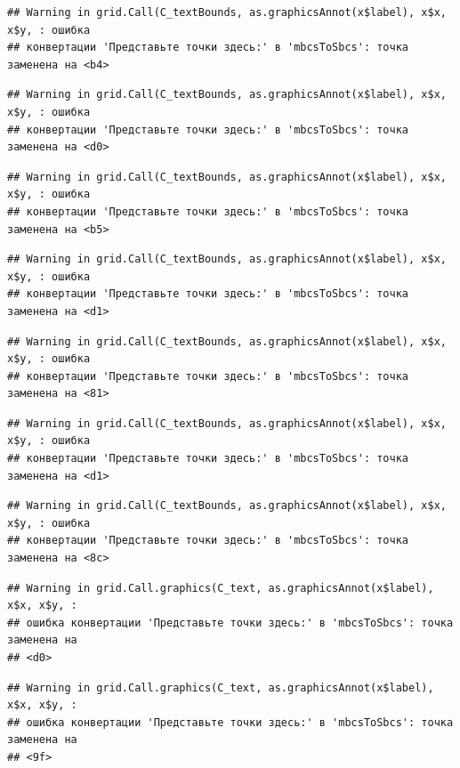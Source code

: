 \documentclass[]{book}
\begin{document}
\begin{verbatim}
## Warning in grid.Call(C_textBounds, as.graphicsAnnot(x$label), x$x, x$y, : ошибка
## конвертации 'Представьте точки здесь:' в 'mbcsToSbcs': точка заменена на <b4>
\end{verbatim}

\begin{verbatim}
## Warning in grid.Call(C_textBounds, as.graphicsAnnot(x$label), x$x, x$y, : ошибка
## конвертации 'Представьте точки здесь:' в 'mbcsToSbcs': точка заменена на <d0>
\end{verbatim}

\begin{verbatim}
## Warning in grid.Call(C_textBounds, as.graphicsAnnot(x$label), x$x, x$y, : ошибка
## конвертации 'Представьте точки здесь:' в 'mbcsToSbcs': точка заменена на <b5>
\end{verbatim}

\begin{verbatim}
## Warning in grid.Call(C_textBounds, as.graphicsAnnot(x$label), x$x, x$y, : ошибка
## конвертации 'Представьте точки здесь:' в 'mbcsToSbcs': точка заменена на <d1>
\end{verbatim}

\begin{verbatim}
## Warning in grid.Call(C_textBounds, as.graphicsAnnot(x$label), x$x, x$y, : ошибка
## конвертации 'Представьте точки здесь:' в 'mbcsToSbcs': точка заменена на <81>
\end{verbatim}

\begin{verbatim}
## Warning in grid.Call(C_textBounds, as.graphicsAnnot(x$label), x$x, x$y, : ошибка
## конвертации 'Представьте точки здесь:' в 'mbcsToSbcs': точка заменена на <d1>
\end{verbatim}

\begin{verbatim}
## Warning in grid.Call(C_textBounds, as.graphicsAnnot(x$label), x$x, x$y, : ошибка
## конвертации 'Представьте точки здесь:' в 'mbcsToSbcs': точка заменена на <8c>
\end{verbatim}

\begin{verbatim}
## Warning in grid.Call.graphics(C_text, as.graphicsAnnot(x$label), x$x, x$y, :
## ошибка конвертации 'Представьте точки здесь:' в 'mbcsToSbcs': точка заменена на
## <d0>
\end{verbatim}

\begin{verbatim}
## Warning in grid.Call.graphics(C_text, as.graphicsAnnot(x$label), x$x, x$y, :
## ошибка конвертации 'Представьте точки здесь:' в 'mbcsToSbcs': точка заменена на
## <9f>
\end{verbatim}
\end{document}
